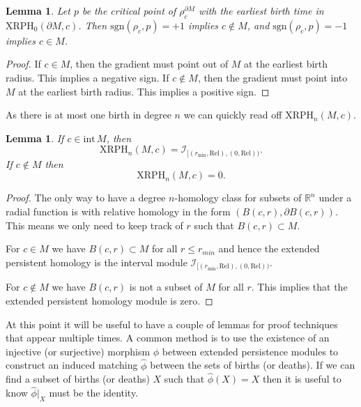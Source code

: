 \documentclass[a4paper,11pt]{article}
\newtheorem{lemma}[theorem]{Lemma}
\theoremstyle{definition}
\newcommand{\R}{\mathbb{R}}
\begin{document}
\begin{lemma}
Let $p$ be the critical point of $\rho_c^{\partial M}$ with the earliest birth time in $\mathrm{XRPH}_0(\partial M,c)$. Then $\mathrm{sgn}(\rho_c,p)=+1$ implies $c\notin M$, and $\mathrm{sgn}(\rho_c,p)=-1$ implies $c\in M$.
\end{lemma}
\begin{proof}
If $c\in M$, then the gradient must point out of $M$ at the earliest birth radius. This implies a negative sign. 
If $c\notin M$, then the gradient must point into $M$ at the earliest birth radius. This implies a positive sign.   
\end{proof}

As there is at most one birth in degree $n$ we can quickly read off $\mathrm{XRPH}_n(M,c)$.

\begin{lemma}
    If $c\in \text{int}\,M$, then $$\mathrm{XRPH}_n(M,c)=\mathcal{I}_{[(r_{\min},\text{Rel}),(0,\text{Rel}))}.$$ 
    If $c\notin  M$ then $$\mathrm{XRPH}_n(M,c)=0.$$
\end{lemma}
\begin{proof}

The only way to have a degree $n$-homology class for subsets of $\R^n$ under a radial function is with relative homology in the form $(B(c,r), \partial B(c,r))$. This means we only need to keep track of $r$ such that $B(c,r)\subset M$.  

For $c\in M$ we have $B(c,r)\subset M$ for all $r\leq r_{min}$ and hence the extended persistent homology is the interval module $\mathcal{I}_{[(r_{\min},\text{Rel}),(0,\text{Rel}))}$.

For $c\notin M$ we have $B(c,r)$ is not a subset of $M$ for all $r$. This implies that the extended persistent homology module is zero.

\end{proof}

At this point it will be useful to have a couple of lemmas for proof techniques that appear multiple times. A common method is to use the existence of an injective (or surjective) morphism $\phi$ between extended persistence modules to construct an induced matching $\hat{\phi}$ between the sets of births (or deaths). If we can find a subset of births (or deaths) $X$ such that $\hat{\phi}(X)=X$ then it is useful to know $\hat{\phi}|_X$ must be the identity.
\end{document}
